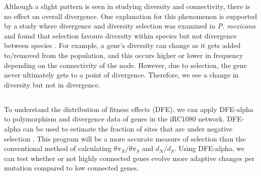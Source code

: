 \documentclass[letterpaper, 10 pt, conference]{ieeeconf}  %
\begin{document}
Although a slight pattern is seen in studying diversity and connectivity, there is no effect on overall divergence. One explanation for this phenomenon is supported by a study where divergence and diversity selection was examined in \textit{P. mexicana} and found that selection favours diversity within species but not divergence between species \cite{tprsgm}. For example, a gene's diversity can change as it gets added to/removed from the population, and this occurs higher or lower in frequency depending on the connectivity of the node. However, due to selection, the gene never ultimately gets to a point of divergence. Therefore, we see a change in diversity but not in divergence. 
\setlength{\parindent}{10ex}



\subsection*{}


To understand the distribution of fitness effects (DFE), we can apply DFE-alpha to polymorphism and divergence data of genes in the iRC1080 network. DFE-alpha can be used to estimate the fraction of sites that are under negative selection \cite{ek09, ke07, kk13}. This program will be a more accurate measure of selection than the conventional method of calculating $\theta \pi_N/\theta \pi_S$ and  $d_N/d_S$. Using DFE-alpha, we can test whether or not highly connected genes evolve more adaptive changes per mutation compared to low connected genes. 
\end{document}
